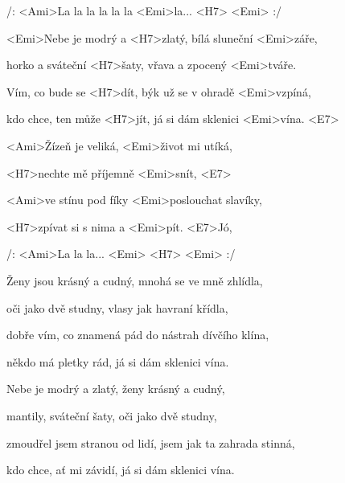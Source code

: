 

/: <Ami>La la la la la la <Emi>la... <H7> <Emi> :/

\zs
<Emi>Nebe je modrý a <H7>zlatý, bílá sluneční <Emi>záře,

horko a sváteční <H7>šaty, vřava a zpocený <Emi>tváře.

Vím, co bude se <H7>dít, býk už se v ohradě <Emi>vzpíná,

kdo chce, ten může <H7>jít, já si dám sklenici <Emi>vína. <E7>
\ks

\zr
<Ami>Žízeň je veliká, <Emi>život mi utíká,

<H7>nechte mě příjemně <Emi>snít, <E7>

<Ami>ve stínu pod fíky <Emi>poslouchat slavíky,

<H7>zpívat si s nima a <Emi>pít. <E7>Jó,

/: <Ami>La la la... <Emi> <H7> <Emi> :/

\kr

\zs
Ženy jsou krásný a cudný, mnohá se ve mně zhlídla,

oči jako dvě studny, vlasy jak havraní křídla,

dobře vím, co znamená pád do nástrah dívčího klína,

někdo má pletky rád, já si dám sklenici vína.
\ks

\zr \kr

\zs
Nebe je modrý a zlatý, ženy krásný a cudný,

mantily, sváteční šaty, oči jako dvě studny,

zmoudřel jsem stranou od lidí, jsem jak ta zahrada stinná,

kdo chce, ať mi závidí, já si dám sklenici vína.
\ks

\zr \kr

\kp






















